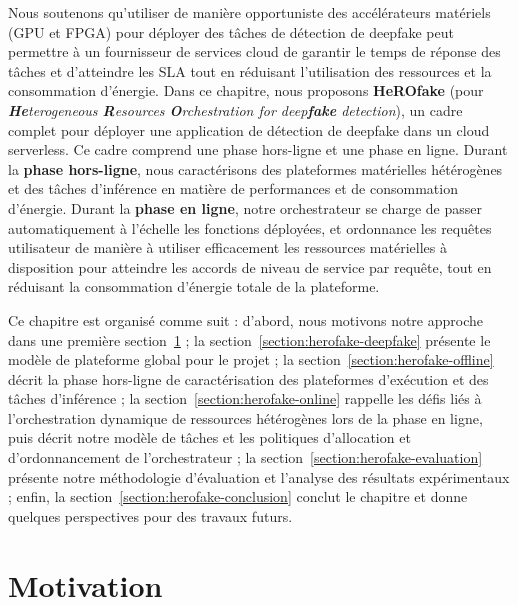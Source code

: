 Nous soutenons qu'utiliser de manière opportuniste des accélérateurs matériels (\gls{GPU} et \gls{FPGA}) pour déployer des tâches de détection de deepfake peut permettre à un fournisseur de services cloud de garantir le temps de réponse des tâches et d'atteindre les \gls{SLA} tout en réduisant l'utilisation des ressources et la consommation d'énergie. Dans ce chapitre, nous proposons \textbf{HeROfake} (pour \textit{\textbf{He}terogeneous \textbf{R}esources \textbf{O}rchestration for deep\textbf{fake} detection}), un cadre complet pour déployer une application de détection de deepfake dans un cloud serverless. Ce cadre comprend une phase hors-ligne et une phase en ligne. Durant la \textbf{phase hors-ligne}, nous caractérisons des plateformes matérielles hétérogènes et des tâches d'inférence en matière de performances et de consommation d'énergie. Durant la \textbf{phase en ligne}, notre orchestrateur se charge de passer automatiquement à l'échelle les fonctions déployées, et ordonnance les requêtes utilisateur de manière à utiliser efficacement les ressources matérielles à disposition pour atteindre les accords de niveau de service par requête, tout en réduisant la consommation d'énergie totale de la plateforme.

Ce chapitre est organisé comme suit : d'abord, nous motivons notre approche dans une première section~\ref{section:herofake-motivation} ; la section~\ref{section:herofake-deepfake} présente le modèle de plateforme global pour le projet ; la section~\ref{section:herofake-offline} décrit la phase hors-ligne de caractérisation des plateformes d'exécution et des tâches d'inférence ; la section~\ref{section:herofake-online} rappelle les défis liés à l'orchestration dynamique de ressources hétérogènes lors de la phase en ligne, puis décrit notre modèle de tâches et les politiques d'allocation et d'ordonnancement de l'orchestrateur ; la section~\ref{section:herofake-evaluation} présente notre méthodologie d'évaluation et l'analyse des résultats expérimentaux ; enfin, la section~\ref{section:herofake-conclusion} conclut le chapitre et donne quelques perspectives pour des travaux futurs.

\section{Motivation}
\label{section:herofake-motivation}

